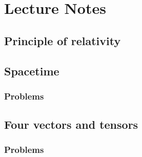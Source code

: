 %
%
\part{Lecture Notes}
   \chapter{Principle of relativity}
      
      

   \chapter{Spacetime}
      
      
      
      
      \section{Problems}
         
         

   \chapter{Four vectors and tensors}
      
      
      \section{Problems}
         
         
         
         
         
         
         
         
         
         
         
         

